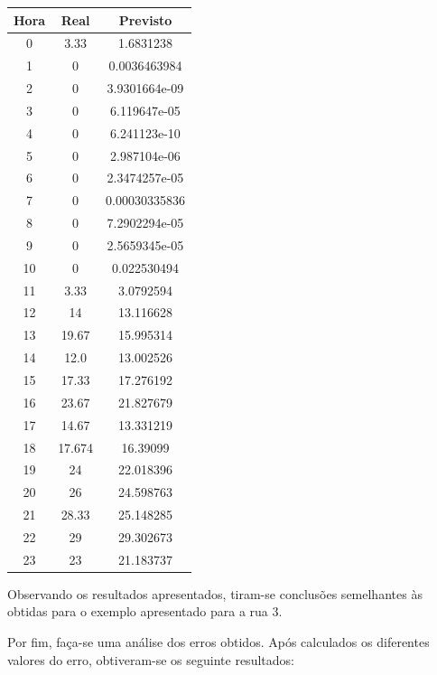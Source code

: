 \documentclass[a4paper, 12pt]{article}
\begin{document}
\begin{table}[H]
	\centering
	\begin{tabular}{||c||c|c||}
		\hline\hline
		Hora & Real&Previsto\\
		\hline\hline
		0 & 
3.33
 & 1.6831238\\
		\hline
		1  &
0 &0.0036463984 \\
		\hline
		2 & 0 & 	3.9301664e-09\\
		\hline
		3  & 0

 &  6.119647e-05\\
		\hline
		4 & 0
 &6.241123e-10 \\
		\hline
		5  &0 
 &2.987104e-06 \\
		\hline
		6 & 0

 & 

2.3474257e-05 \\
		\hline
		7 & 0

 & 0.00030335836\\
		\hline
		8  &0
 & 7.2902294e-05\\
		\hline
		9 & 0 &  2.5659345e-05	\\
		\hline
		10 & 
0
 & 0.022530494 \\
		\hline
		11  &
3.33 &3.0792594 \\
		\hline
		12 & 14 & 13.116628	\\
		\hline
		13  & 
19.67 
 &  15.995314\\
		\hline
		14 & 
 12.0 &  13.002526\\
		\hline
		15  & 17.33
 & 17.276192\\
		\hline
		16 & 
23.67
 & 21.827679

 \\
		\hline
		17 & 
14.67
 &13.331219 \\
		\hline
		18  &
 17.674& 16.39099\\
		\hline
		19 & 24 & 	22.018396\\
		\hline
		20 & 
26
 & 24.598763 \\
		\hline
		21  &
 28.33& 25.148285\\
		\hline
		22 & 29 & 29.302673	\\
		\hline
		23  & 
23
 & 21.183737\\
		\hline\hline
	\end{tabular}
\end{table}

Observando os resultados apresentados, tiram-se conclusões semelhantes às obtidas para o exemplo apresentado para a rua $3$.

Por fim, faça-se uma análise dos erros obtidos. Após calculados os diferentes valores do erro, obtiveram-se os seguinte resultados:
\end{document}
